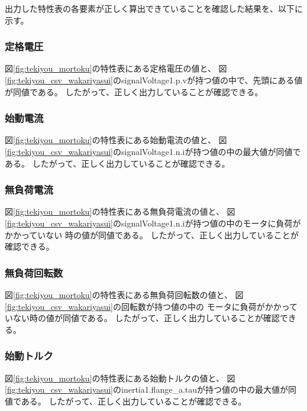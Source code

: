 出力した特性表の各要素が正しく算出できていることを確認した結果を、以下に示す。

\subsubsection{定格電圧}
図\ref{fig:tekiyou_mortoku}の特性表にある定格電圧の値と、
図\ref{fig:tekiyou_csv_wakariyasui}のsignalVoltage1.p.vが持つ値の中で、先頭にある値が同値である。
したがって、正しく出力していることが確認できる。

\subsubsection{始動電流}
図\ref{fig:tekiyou_mortoku}の特性表にある始動電流の値と、
図\ref{fig:tekiyou_csv_wakariyasui}のsignalVoltage1.n.iが持つ値の中の最大値が同値である。
したがって、正しく出力していることが確認できる。


\subsubsection{無負荷電流}
図\ref{fig:tekiyou_mortoku}の特性表にある無負荷電流の値と、
図\ref{fig:tekiyou_csv_wakariyasui}のsignalVoltage1.n.iが持つ値の中のモータに負荷がかかっていない
時の値が同値である。
したがって、正しく出力していることが確認できる。
\subsubsection{無負荷回転数}
図\ref{fig:tekiyou_mortoku}の特性表にある無負荷回転数の値と、
図\ref{fig:tekiyou_csv_wakariyasui}の回転数が持つ値の中の
モータに負荷がかかっていない時の値が同値である。
したがって、正しく出力していることが確認できる。

\subsubsection{始動トルク}
図\ref{fig:tekiyou_mortoku}の特性表にある始動トルクの値と、
図\ref{fig:tekiyou_csv_wakariyasui}のinertia1.flange\_a.tauが持つ値の中の最大値が同値である。
したがって、正しく出力していることが確認できる。


